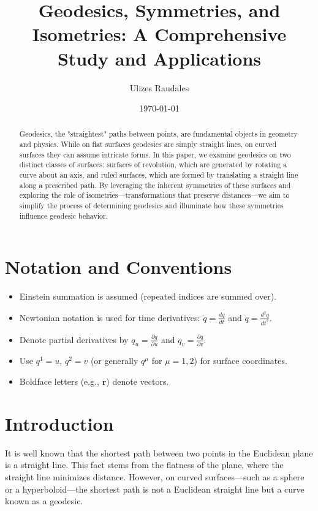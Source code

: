 \documentclass[12pt]{article}
\title{Geodesics, Symmetries, and Isometries: A Comprehensive Study and Applications}
\author{Ulizes Raudales}
\date{\today}
\begin{document}
\maketitle

\newpage
\tableofcontents
\newpage

\begin{abstract}
    Geodesics, the "straightest" paths between points, are fundamental objects in geometry and physics. 
    While on flat surfaces geodesics are simply straight lines, on curved surfaces they can assume intricate forms. 
    In this paper, we examine geodesics on two distinct classes of surfaces: surfaces of revolution, which are generated by rotating a curve about an axis, and ruled surfaces, which are formed by translating a straight line along a prescribed path. 
    By leveraging the inherent symmetries of these surfaces and exploring the role of isometries—transformations that preserve distances—we aim to simplify the process of determining geodesics and illuminate how these symmetries influence geodesic behavior. 
\end{abstract}

\newpage

\section*{Notation and Conventions}
\begin{itemize}
    \item Einstein summation is assumed (repeated indices are summed over).
    \item Newtonian notation is used for time derivatives: \(\dot{q} = \frac{dq}{dt}\) and \(\ddot{q} = \frac{d^2q}{dt^2}\).
    \item Denote partial derivatives by \(q_u = \frac{\partial q}{\partial u}\) and \(q_v = \frac{\partial q}{\partial v}\).
    \item Use \(q^1=u\), \(q^2=v\) (or generally \(q^\mu\) for \(\mu=1,2\)) for surface coordinates.
    \item Boldface letters (e.g., \(\mathbf{r}\)) denote vectors.
\end{itemize}

\newpage

\section{Introduction}

It is well known that the shortest path between two points in the Euclidean plane is a straight line. 
This fact stems from the flatness of the plane, where the straight line minimizes distance. 
However, on curved surfaces—such as a sphere or a hyperboloid—the shortest path is not a Euclidean straight line but a curve known as a geodesic.
\end{document}
